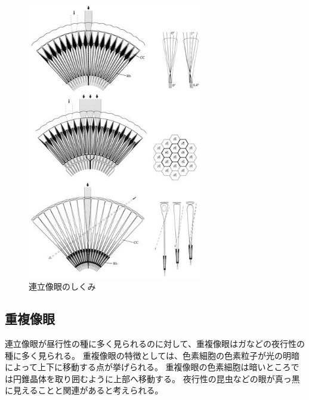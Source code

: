 \begin{figure}[hn]
  \centering
  \includegraphics[width=3.0in]{./img/renrituzougan.jpg}
  \caption{連立像眼のしくみ}
  \label{FRenritsu}
\end{figure}


\subsection{重複像眼}

連立像眼が昼行性の種に多く見られるのに対して、重複像眼はガなどの夜行性の種に多く見られる。
重複像眼の特徴としては、色素細胞の色素粒子が光の明暗によって上下に移動する点が挙げられる。
重複像眼の色素細胞は暗いところでは円錐晶体を取り囲むように上部へ移動する。
夜行性の昆虫などの眼が真っ黒に見えることと関連があると考えられる。

